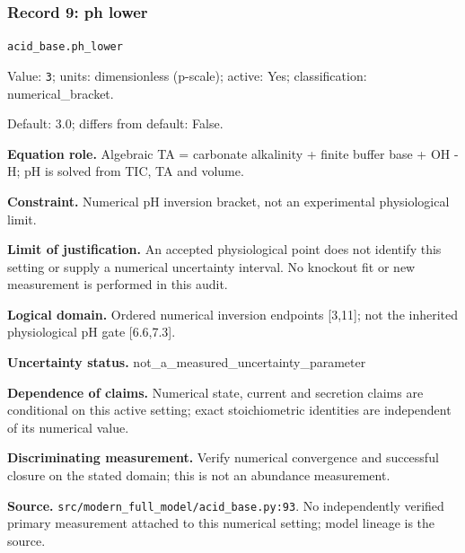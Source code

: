 \subsubsection*{Record 9: ph lower}
{\small \nolinkurl{acid_base.ph_lower}\par

Value: \texttt{3}; units: dimensionless (p-scale); active: Yes; classification: numerical\_bracket.\par

Default: 3.0; differs from default: False.\par

\textbf{Equation role.} Algebraic TA = carbonate alkalinity + finite buffer base + OH - H; pH is solved from TIC, TA and volume.\par

\textbf{Constraint.} Numerical pH inversion bracket, not an experimental physiological limit.\par

\textbf{Limit of justification.} An accepted physiological point does not identify this setting or supply a numerical uncertainty interval. No knockout fit or new measurement is performed in this audit.\par

\textbf{Logical domain.} Ordered numerical inversion endpoints [3,11]; not the inherited physiological pH gate [6.6,7.3].\par

\textbf{Uncertainty status.} not\_a\_measured\_uncertainty\_parameter\par

\textbf{Dependence of claims.} Numerical state, current and secretion claims are conditional on this active setting; exact stoichiometric identities are independent of its numerical value.\par

\textbf{Discriminating measurement.} Verify numerical convergence and successful closure on the stated domain; this is not an abundance measurement.\par

\textbf{Source.} \nolinkurl{src/modern_full_model/acid_base.py:93}. No independently verified primary measurement attached to this numerical setting; model lineage is the source.\par}

